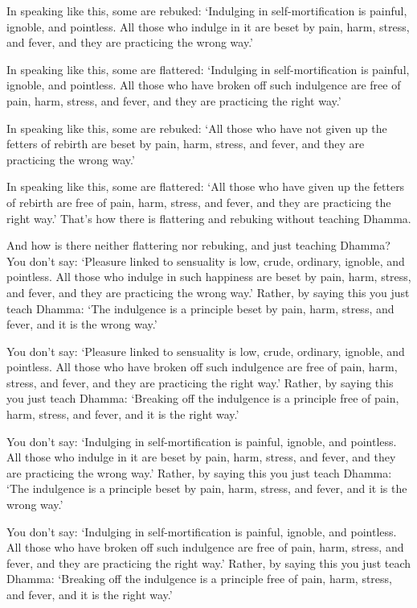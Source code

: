 \documentclass[12pt,openany]{book}%
\begin{document}
In speaking like this, some are rebuked: ‘Indulging in self-mortification is painful, ignoble, and pointless. All those who indulge in it are beset by pain, harm, stress, and fever, and they are practicing the wrong way.’ 

In speaking like this, some are flattered: ‘Indulging in self-mortification is painful, ignoble, and pointless. All those who have broken off such indulgence are free of pain, harm, stress, and fever, and they are practicing the right way.’ 

In speaking like this, some are rebuked: ‘All those who have not given up the fetters of rebirth are beset by pain, harm, stress, and fever, and they are practicing the wrong way.’ 

In speaking like this, some are flattered: ‘All those who have given up the fetters of rebirth are free of pain, harm, stress, and fever, and they are practicing the right way.’ That’s how there is flattering and rebuking without teaching Dhamma. 

And how is there neither flattering nor rebuking, and just teaching Dhamma? You don’t say: ‘Pleasure linked to sensuality is low, crude, ordinary, ignoble, and pointless. All those who indulge in such happiness are beset by pain, harm, stress, and fever, and they are practicing the wrong way.’ Rather, by saying this you just teach Dhamma: ‘The indulgence is a principle beset by pain, harm, stress, and fever, and it is the wrong way.’ 

You don’t say: ‘Pleasure linked to sensuality is low, crude, ordinary, ignoble, and pointless. All those who have broken off such indulgence are free of pain, harm, stress, and fever, and they are practicing the right way.’ Rather, by saying this you just teach Dhamma: ‘Breaking off the indulgence is a principle free of pain, harm, stress, and fever, and it is the right way.’ 

You don’t say: ‘Indulging in self-mortification is painful, ignoble, and pointless. All those who indulge in it are beset by pain, harm, stress, and fever, and they are practicing the wrong way.’ Rather, by saying this you just teach Dhamma: ‘The indulgence is a principle beset by pain, harm, stress, and fever, and it is the wrong way.’ 

You don’t say: ‘Indulging in self-mortification is painful, ignoble, and pointless. All those who have broken off such indulgence are free of pain, harm, stress, and fever, and they are practicing the right way.’ Rather, by saying this you just teach Dhamma: ‘Breaking off the indulgence is a principle free of pain, harm, stress, and fever, and it is the right way.’ 
\end{document}
